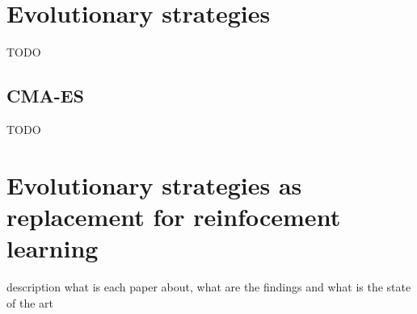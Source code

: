 \section{Evolutionary strategies}
\label{sec:es}
TODO \cite{Rudolph2012}
\subsection{CMA-ES}
\label{subsec:cma-es}
TODO \cite{Hansen06}
\section{Evolutionary strategies as replacement for reinfocement learning}
\label{sec:es-reinf}
description what is each paper about, what are the findings and what is the state of the art

